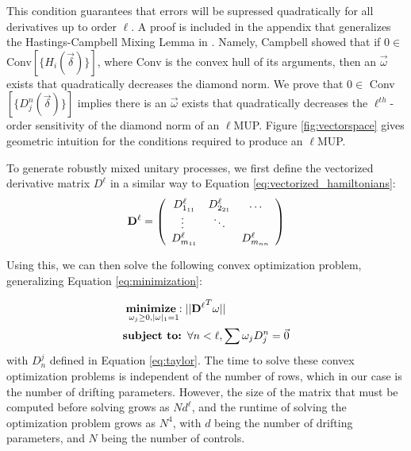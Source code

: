\documentclass[aps,nofootinbib,pra,notitlepage,twocolumn]{revtex4-1}
\begin{document}
This condition guarantees that errors will be supressed quadratically for all derivatives up to order $\ell$. A proof is included in the appendix that generalizes the Hastings-Campbell Mixing Lemma in \cite{Campbell2017}. Namely, Campbell showed that if $0\in $ Conv$[\{H_i(\vec{\delta})\}]$, where Conv is the convex hull of its arguments, then an $\vec{\omega}$ exists that quadratically decreases the diamond norm. We prove that $0\in $ Conv$[\{D_j^n(\vec{\delta})\}]$ implies there is an $\vec{\omega}$ exists that quadratically decreases the $\ell^{th}$-order sensitivity of the diamond norm of an $\ell$MUP. Figure \ref{fig:vectorspace} gives geometric intuition for the conditions required to produce an $\ell$MUP.

To generate robustly mixed unitary processes, we first define the vectorized derivative matrix ${D^{\ell}}$ in a similar way to Equation \ref{eq:vectorized_hamiltonians}:
\begin{equation}
{\bold{D}^{\ell}} =  \left(\begin{array}{cccc}
		D^\ell_{1_{11}} & D^\ell_{2_{21}} & \ldots   \\ 
		\vdots\ & \ddots &    \\
		D^\ell_{m_{11}} &  &  D^\ell_{m_{nn}} \\ 
	\end{array} 	
	\right)
\end{equation}

Using this, we can then solve the following convex optimization problem, generalizing Equation \ref{eq:minimization}:

\begin{equation}\label{eq:robust_minimization}
  \begin{split}
    &\underset{\omega_j\geq0, |\omega|_1=1}{\textbf{minimize}: } ||{\bold{D}^{\ell}}^T\omega||\\
    &\textbf{subject to: } \forall n<\ell, \sum \omega_jD_j^n=\vec{0}\\
  \end{split}
\end{equation}
with $D_n^j$ defined in Equation \ref{eq:taylor}. The time to solve these convex optimization problems is independent of the number of rows, which in our case is the number of drifting parameters. However, the size of the matrix that must be computed before solving grows as $Nd^{\ell}$, and the runtime of solving the optimization problem grows as $N^4$, with $d$ being the number of drifting parameters, and $N$ being the number of controls.
\end{document}
